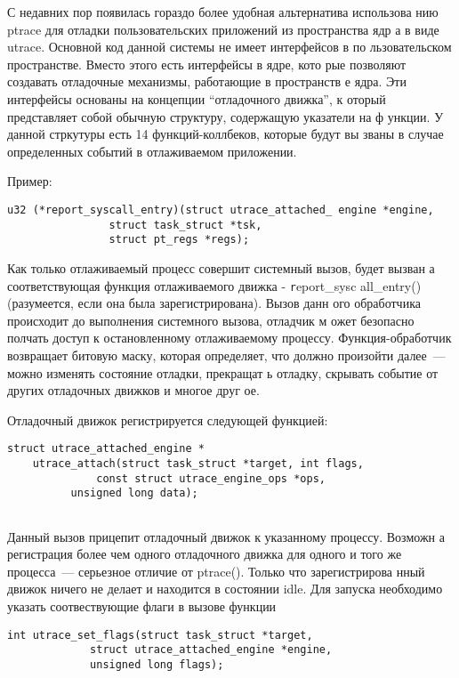 С недавних пор появилась гораздо более удобная альтернатива использова
нию ptrace для отладки пользовательских приложений из пространства ядр
а в виде utrace. Основной код данной системы не имеет интерфейсов в по
льзовательском пространстве. Вместо этого есть интерфейсы в ядре, кото
рые позволяют создавать отладочные механизмы, работающие в пространств
е ядра. Эти интерфейсы основаны на концепции ``отладочного движка'', к
оторый представляет собой обычную структуру, содержащую указатели на ф
ункции. У данной стркутуры есть 14 функций-коллбеков, которые будут вы
званы в случае определенных событий в отлаживаемом приложении. 

\bigskip 
Пример:

\bigskip
\begin{lstlisting}
u32 (*report_syscall_entry)(struct utrace_attached_ engine *engine,
				struct task_struct *tsk,
				struct pt_regs *regs);

\end{lstlisting}

\bigskip
Как только отлаживаемый процесс совершит системный вызов, будет вызван
а соответствующая функция отлаживаемого движка - {\texttt report\_sysc
all\_entry()} (разумеется, если она была зарегистрирована). Вызов данн
ого обработчика происходит до выполнения системного вызова, отладчик м
ожет безопасно полчать доступ к остановленному отлаживаемому процессу.
 Функция-обработчик возвращает битовую маску, которая определяет, что 
должно произойти далее~--- можно изменять состояние отладки, прекращат
ь отладку, скрывать событие от других отладочных движков и многое друг
ое. 

Отладочный движок регистрируется следующей функцией: 
\bigskip
\begin{lstlisting}
struct utrace_attached_engine *
    utrace_attach(struct task_struct *target, int flags,
	      	  const struct utrace_engine_ops *ops, 
		  unsigned long data);
  
\end{lstlisting}

\bigskip 
Данный вызов прицепит отладочный движок к указанному процессу. Возможн
а регистрация более чем одного отладочного движка для одного и того же
 процесса~--- серьезное отличие от ptrace(). Только что зарегистрирова
нный движок ничего не делает и находится в состоянии idle. Для запуска
 необходимо указать соотвествующие флаги в вызове функции 

\bigskip
\begin{lstlisting}
int utrace_set_flags(struct task_struct *target,
			 struct utrace_attached_engine *engine,
			 unsigned long flags);

\end{lstlisting}

